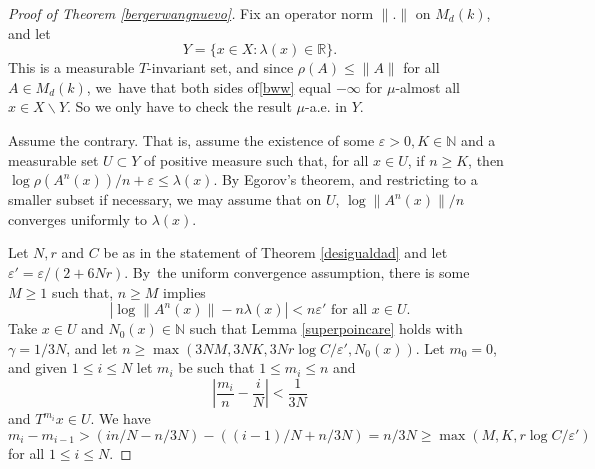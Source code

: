 \documentclass[JEP,XML,SOM,Unicode,NoEqCountersInSection]{cedram}
\let\epsilon\varepsilon
\theoremstyle{plain}
\theoremstyle{definition}
\newcommand{\NN}{\mathbb{N}}
\newcommand{\RR}{\mathbb{R}}
\newcommand{\ccl}[3]{#1^{#2}(#3)}
\begin{document}
\begin{proof}[Proof of Theorem \ref{bergerwangnuevo}]
Fix an operator norm $\|.\|$ on $M_{d}(k)$, and let
\[
Y=\{x\in X : \lambda(x)\in \RR\}.
\]
This is a measurable $T$-invariant set, and since $\rho(A)\leq \|A\|$ for all $A\in M_{d}(k)$, we~have that both sides of\eqref{bww} equal $-\infty$ for $\mu$-almost all $x\in X\backslash Y$. So we only have to check the result $\mu$-a.e. in $Y$.

Assume the contrary. That is, assume the existence of some $\epsilon>0, K\in \NN$ and a measurable set $U\subset Y$ of positive measure such that, for all $x\in U$, if $n\geq K$, then $\log{\rho(\ccl{A}{n}{x})}/n+\epsilon \leq \lambda(x)$.
By Egorov's theorem, and restricting to a smaller subset if necessary, we may assume that on $U$, $\log{\|\ccl{A}{n}{x}\|}/n$ converges uniformly to $\lambda(x)$.

Let $N,r$ and $C$ be as in the statement of Theorem \ref{desigualdad} and let $\epsilon'=\epsilon/(2+6Nr)$. By~the uniform convergence assumption, there is some $M\geq 1$ such that, $ n\geq M$ implies
\begin{equation}\label{necesaria1}
|\log{\|\ccl{A}{n}{x}\|}-n\lambda(x)|<n\epsilon' \text{ for all }x\in U.
\end{equation}
Take $x\in U$ and $N_0(x)\in \NN$ such that Lemma \ref{superpoincare} holds with $\gamma=1/3N$, and let $n\geq \max(3NM,3NK,3Nr\log{C}/\epsilon',N_0(x))$. Let $m_0=0$, and given $1\leq i\leq N$ let $m_i$ be such that $1\leq m_i \leq n$ and
\begin{equation}\label{fracrecu}
\left|\frac{m_i}{n}-\frac{i}{N}\right|<\frac{1}{3N}
\end{equation}
and $T^{m_i}x\in U$. We have
\[
m_{i}-m_{i-1}>(in/N-n/3N)-((i-1)/N+n/3N)=n/3N\geq \max(M,K,r\log{C}/\epsilon')
\]
for all $1\leq i\leq N$.


\end{proof}
\end{document}
